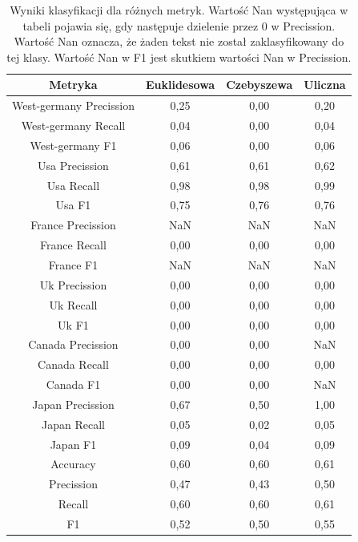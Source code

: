 \documentclass{classrep}
\begin{document}
\newpage
\begin{table}[h!]
\caption{Wyniki klasyfikacji dla różnych metryk. Wartość Nan występująca w tabeli pojawia się, gdy następuje dzielenie przez 0 w Precission. Wartość Nan oznacza, że żaden tekst nie został zaklasyfikowany do tej klasy. Wartość Nan w F1 jest skutkiem wartości Nan w Precission.}
\centering
\vspace{0.1cm}
 \begin{tabular}{c c c c}

    \textbf{Metryka} & \textbf{Euklidesowa}   & \textbf{Czebyszewa}  & \textbf{Uliczna}  \\

\hline
West-germany Precission 	& 0,25 & 0,00 & 0,20 \\
West-germany Recall 		& 0,04 & 0,00 & 0,04 \\
West-germany F1		& 0,06 & 0,00 & 0,06 \\
\hline
Usa Precission 			& 0,61 & 0,61 & 0,62 \\
Usa Recall				& 0,98 & 0,98 & 0,99 \\
Usa F1			 	& 0,75 & 0,76 & 0,76 \\
\hline
France Precission 		& NaN & NaN & NaN \\
France Recall 			& 0,00 & 0,00 & 0,00 \\
France F1 				& NaN & NaN & NaN \\
\hline
Uk Precission 			& 0,00 & 0,00 & 0,00 \\
Uk Recall 				& 0,00 & 0,00 & 0,00 \\
Uk F1 				& 0,00 & 0,00 & 0,00 \\
\hline
Canada Precission		& 0,00 & 0,00 & NaN \\
Canada Recall 			& 0,00 & 0,00 & 0,00 \\
Canada F1 			& 0,00 & 0,00 & NaN \\
\hline
Japan Precission 		& 0,67 & 0,50 & 1,00 \\
Japan Recall 			& 0,05 & 0,02 & 0,05 \\
Japan F1 				& 0,09 & 0,04 & 0,09 \\
\hline
Accuracy 				& 0,60 & 0,60 & 0,61 \\
Precission 				& 0,47 & 0,43 & 0,50 \\
Recall 				& 0,60 & 0,60 & 0,61 \\
F1 					& 0,52 & 0,50 & 0,55 \\

\end {tabular}
\label {Wyniki klasyfikacji dla różnych metryk.}
\end{table}
\end{document}
